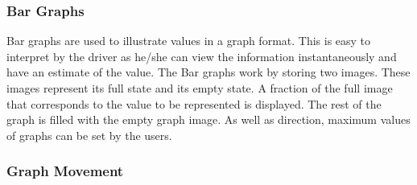 \documentclass[11pt]{report} %
\begin{document}
	\subsubsection{Bar Graphs}
		
	Bar graphs are used to illustrate values in a graph format. This is easy to interpret by the driver
	as he/she can view the information instantaneously and have an estimate of the value. The Bar graphs 
	work by storing two images. These images represent its full state and its empty state. A fraction of the full image that 
	corresponds to the value to be represented is displayed. The rest of the graph is filled with the empty graph image.
	As well as direction, maximum values of graphs can be set by the users.
			
			
	\subsubsection{Graph Movement}
			
\end{document}

